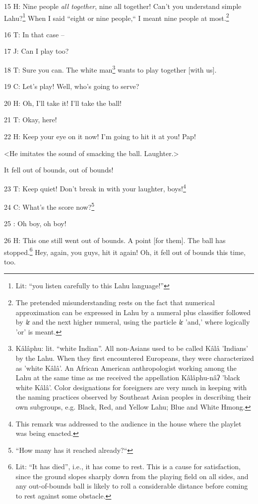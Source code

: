 15 H: Nine people \textit{all together}, nine all together! Can't you understand
simple Lahu?\footnote{Lit: ``you listen carefully to this Lahu language!''} When I said ``eight or nine people,`` I meant
nine people at most.\footnote{The pretended misunderstanding rests on the fact that numerical approximation can be expressed in Lahu by a numeral plus classifier followed by \textit{lɛ }and the next higher numeral, using the particle \textit{lɛ} 'and,' where logically 'or' is meant.}

16 T: In that case --

17 J: Can I play too?

18 T: Sure you can. The white man\footnote{Kâlâphu: lit. ``white Indian''. All non-Asians used to be called Kâlâ 'Indians' by the Lahu. When they first encountered Europeans, they were characterized as 'white Kâlâ'. An African American anthropologist working among the Lahu at the same time as me received the appellation Kâlâphu-nâʔ 'black white Kâlâ'. Color designations for foreigners are very much in keeping with the naming practices observed by Southeast Asian peoples in describing their own subgroups, e.g. Black, Red, and Yellow Lahu; Blue and White Hmong.} wants to play together [with us].

19 C: Let's play! Well, who's going to serve?

20 H: Oh, I'll take it! I'll take the ball!

21 T: Okay, here!

22 H: Keep your eye on it now! I'm going to hit it at you! Pap!

<He imitates the sound of smacking the ball. Laughter.>

It fell out of bounds, out of bounds!

23 T: Keep quiet! Don't break in with your laughter, boys!\footnote{This remark was addressed to the audience in the house where the playlet was being enacted.}

24 C: What's the score now?\footnote{``How many has it reached already?``}

25 : Oh boy, oh boy!

26 H: This one still went out of bounds. A point [for them]. The ball has stopped.\footnote{Lit: ``It has died'', i.e., it has come to rest. This is a cause for satisfaction, since the ground slopes sharply down from the playing field on all sides, and any out-of-bounds ball is likely to roll a considerable distance before coming to rest against some obstacle.}
Hey, again, you guys, hit it again! Oh, it fell out of bounds this time, too.


